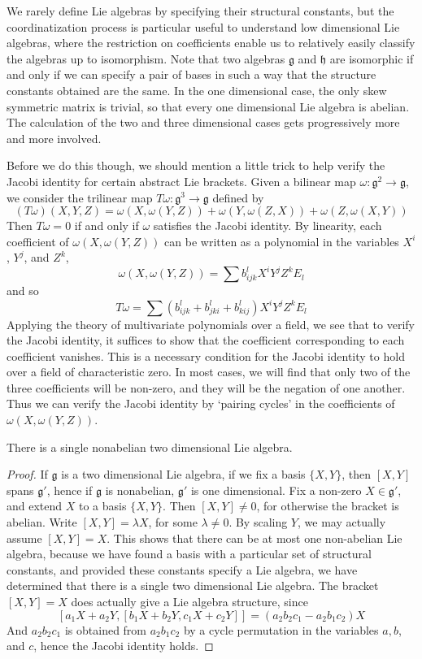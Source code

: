 We rarely define Lie algebras by specifying their structural constants, but the coordinatization process is particular useful to understand low dimensional Lie algebras, where the restriction on coefficients enable us to relatively easily classify the algebras up to isomorphism. Note that two algebras $\mathfrak{g}$ and $\mathfrak{h}$ are isomorphic if and only if we can specify a pair of bases in such a way that the structure constants obtained are the same. In the one dimensional case, the only skew symmetric matrix is trivial, so that every one dimensional Lie algebra is abelian. The calculation of the two and three dimensional cases gets progressively more and more involved.

Before we do this though, we should mention a little trick to help verify the Jacobi identity for certain abstract Lie brackets. Given a bilinear map $\omega: \mathfrak{g}^2 \to \mathfrak{g}$, we consider the trilinear map $T\omega: \mathfrak{g}^3 \to \mathfrak{g}$ defined by
%
\[ (T \omega)(X,Y,Z) = \omega(X, \omega(Y,Z)) + \omega(Y,\omega(Z,X)) + \omega(Z,\omega(X,Y)) \]
%
Then $T \omega = 0$ if and only if $\omega$ satisfies the Jacobi identity. By linearity, each coefficient of $\omega(X,\omega(Y,Z))$ can be written as a polynomial in the variables $X^i$, $Y^j$, and $Z^k$,
%
\[ \omega(X, \omega(Y,Z)) = \sum b_{ijk}^l X^i Y^j Z^k E_l \]
%
and so
%
\[ T\omega = \sum (b_{ijk}^l + b_{jki}^l + b_{kij}^l) X^i Y^j Z^k E_l \]
%
Applying the theory of multivariate polynomials over a field, we see that to verify the Jacobi identity, it suffices to show that the coefficient corresponding to each coefficient vanishes. This is a necessary condition for the Jacobi identity to hold over a field of characteristic zero. In most cases, we will find that only two of the three coefficients will be non-zero, and they will be the negation of one another. Thus we can verify the Jacobi identity by `pairing cycles' in the coefficients of $\omega(X,\omega(Y,Z))$.

\begin{theorem}
    There is a single nonabelian two dimensional Lie algebra.
\end{theorem}
\begin{proof}
    If $\mathfrak{g}$ is a two dimensional Lie algebra, if we fix a basis $\{ X,Y \}$, then $[X,Y]$ spans $\mathfrak{g}'$, hence if $\mathfrak{g}$ is nonabelian, $\mathfrak{g}'$ is one dimensional. Fix a non-zero $X \in \mathfrak{g}'$, and extend $X$ to a basis $\{ X, Y \}$. Then $[X,Y] \neq 0$, for otherwise the bracket is abelian. Write $[X,Y] = \lambda X$, for some $\lambda \neq 0$. By scaling $Y$, we may actually assume $[X,Y] = X$. This shows that there can be at most one non-abelian Lie algebra, because we have found a basis with a particular set of structural constants, and provided these constants specify a Lie algebra, we have determined that there is a single two dimensional Lie algebra. The bracket $[X,Y] = X$ does actually give a Lie algebra structure, since
    \[ [a_1X + a_2Y, [b_1X + b_2Y, c_1X + c_2Y]] = (a_2b_2c_1 - a_2b_1c_2) X \]
    And $a_2b_2c_1$ is obtained from $a_2b_1c_2$ by a cycle permutation in the variables $a,b$, and $c$, hence the Jacobi identity holds.
\end{proof}

